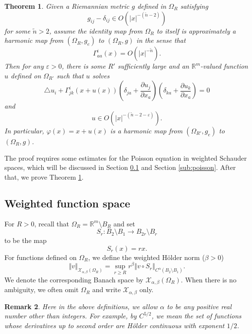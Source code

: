 \documentclass{amsart}
\newtheorem{thm}{Theorem}[section]
\newtheorem{rem}[thm]{Remark}
\newcommand{\norm}[1]{\left\Vert#1\right\Vert}
\newcommand{\abs}[1]{\left\vert#1\right\vert}
\newcommand{\Real}{\mathbb R}
\newcommand{\pfrac}[2]{\frac{\partial #1}{\partial #2}}
\numberwithin{equation}{section}
\begin{document}
\begin{thm}
	\label{thm:pde} Given a Riemannian metric $g$ defined in $\Omega_R$ satisfying
	\begin{equation}
		\label{eqn:almostflat}
		g_{ij}-\delta_{ij}\in O(\abs{x}^{-(\tilde{n}-2)})
	\end{equation}
	for some $\tilde{n}>2$, assume the identity map from $\Omega_R$ to itself is approximately a harmonic map from $(\Omega_R,g_e)$ to $(\Omega_R,g)$ in the sense that
	\begin{equation}
		\label{eqn:hmapprox}
		\Gamma^i_{aa}(x) = O(\abs{x}^{-\tilde{n}}).
	\end{equation}
	Then for any $\varepsilon>0$, there is some $R'$ sufficiently large and an $\Real^m$-valued function $u$ defined on $\Omega_{R'}$ such that $u$ solves 
	\begin{equation}
		\label{eqn:hmpde}
		\triangle u_i + \Gamma^i_{jk}(x+u(x)) \left( \delta_{ja}+\pfrac{u_j}{x_a} \right)\left( \delta_{ka}+\pfrac{u_k}{x_a} \right)=0
	\end{equation}
	and
	\[
		u\in O(\abs{x}^{-(\tilde{n}-2-\varepsilon)}).
	\]
	In particular, $\varphi(x)=x+u(x)$ is a harmonic map from $(\Omega_{R'},g_e)$ to $(\Omega_{R},g)$.
\end{thm}
The proof requires some estimates for the Poisson equation in weighted Schauder spaces, which will be discussed in Section \ref{sub:weighted} and Section \ref{sub:poisson}. After that, we prove Theorem \ref{thm:pde}.

\subsection{Weighted function space}
\label{sub:weighted}
For $R>0$, recall that $\Omega_R= \Real^m \setminus B_R$ and set
\[
	S_r: B_2 \setminus B_1\to B_{2r}\setminus B_{r}
\]
to be the map
\[
	S_r(x)=r x.
\]
For functions defined on $\Omega_R$, we define the weighted H\"older norm ($\beta>0$)
\[
	\norm{v}_{\mathcal X_{\alpha,\beta}(\Omega_R)}= \sup_{r\geq R}  r^{\beta}\norm{v\circ S_r}_{C^\alpha(B_2 \setminus B_1)}.
\]
We denote the corresponding Banach space by $\mathcal X_{\alpha,\beta}(\Omega_R)$. When there is no ambiguity, we often omit $\Omega_R$ and write $\mathcal X_{\alpha,\beta}$ only.

\begin{rem}
	Here in the above definitions, we allow $\alpha$ to be any positive real number other than integers. For example, by $C^{5/2}$, we mean the set of functions whose derivatives up to second order are H\"older continuous with exponent $1/2$.
\end{rem}
\end{document}
